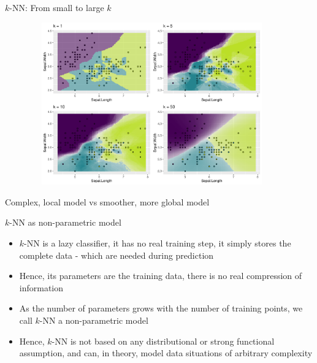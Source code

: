 \documentclass[11pt,compress,t,notes=noshow, xcolor=table]{beamer}
\newenvironment{knitrout}{}{} %
\begin{document}
\begin{vbframe}{$k$-NN: From small to large $k$}

\begin{knitrout}\scriptsize
{}\color{fgcolor}

{\centering \includegraphics[width=0.95\textwidth,height=7cm]{figure/reg_class_knn_2} 

}



\end{knitrout}
Complex, local model vs smoother, more global model

\end{vbframe}

\begin{vbframe}{$k$-NN as non-parametric model}
\begin{itemize}
\item $k$-NN is a lazy classifier, it has no real training step, it simply stores the complete data 
  - which are needed during prediction 
\item Hence, its parameters are the training data, there is no real compression of information
\item As the number of parameters grows with the number of training points, we call 
  $k$-NN a non-parametric model
\item Hence, $k$-NN is not based on any distributional or strong functional assumption,
  and can, in theory, model data situations of arbitrary complexity
\end{itemize}
\end{vbframe}

\end{document}
